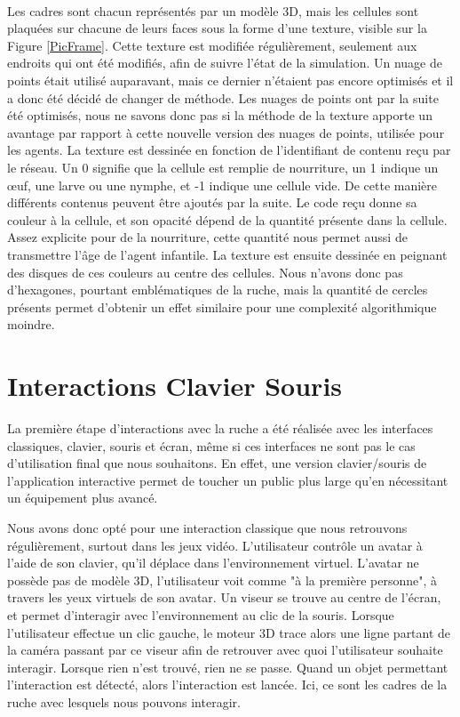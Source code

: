 		\paragraph{}
		Les cadres sont chacun représentés par un modèle 3D, mais les cellules sont plaquées sur chacune de leurs faces sous la forme d'une texture, visible sur la Figure \ref{PicFrame}. Cette texture est modifiée régulièrement, seulement aux endroits qui ont été modifiés, afin de suivre l'état de la simulation. Un nuage de points était utilisé auparavant, mais ce dernier n'étaient pas encore optimisés et il a donc été décidé de changer de méthode. Les nuages de points ont par la suite été optimisés, nous ne savons donc pas si la méthode de la texture apporte un avantage par rapport à cette nouvelle version des nuages de points, utilisée pour les agents. La texture est dessinée en fonction de l'identifiant de contenu reçu par le réseau. Un 0 signifie que la cellule est remplie de nourriture, un 1 indique un œuf, une larve ou une nymphe, et -1 indique une cellule vide. De cette manière différents contenus peuvent être ajoutés par la suite. Le code reçu donne sa couleur à la cellule, et son opacité dépend de la quantité présente dans la cellule. Assez explicite pour de la nourriture, cette quantité nous permet aussi de transmettre l'âge de l'agent infantile. La texture est ensuite dessinée en peignant des disques de ces couleurs au centre des cellules. Nous n'avons donc pas d'hexagones, pourtant emblématiques de la ruche, mais la quantité de cercles présents permet d'obtenir un effet similaire pour une complexité algorithmique moindre.
	
	
	\section{Interactions Clavier Souris}
		La première étape d'interactions avec la ruche a été réalisée avec les interfaces classiques, clavier, souris et écran, même si ces interfaces ne sont pas le cas d'utilisation final que nous souhaitons. En effet, une version clavier/souris de l'application interactive permet de toucher un public plus large qu'en nécessitant un équipement plus avancé.
		
		Nous avons donc opté pour une interaction classique que nous retrouvons régulièrement, surtout dans les jeux vidéo. L'utilisateur contrôle un avatar à l'aide de son clavier, qu'il déplace dans l'environnement virtuel. L'avatar ne possède pas de modèle 3D, l'utilisateur voit comme "à la première personne", à travers les yeux virtuels de son avatar. Un viseur se trouve au centre de l'écran, et permet d'interagir avec l'environnement au clic de la souris. Lorsque l'utilisateur effectue un clic gauche, le moteur 3D trace alors une ligne partant de la caméra passant par ce viseur afin de retrouver avec quoi l'utilisateur souhaite interagir. Lorsque rien n'est trouvé, rien ne se passe. Quand un objet permettant l'interaction est détecté, alors l'interaction est lancée. Ici, ce sont les cadres de la ruche avec lesquels nous pouvons interagir.
		
